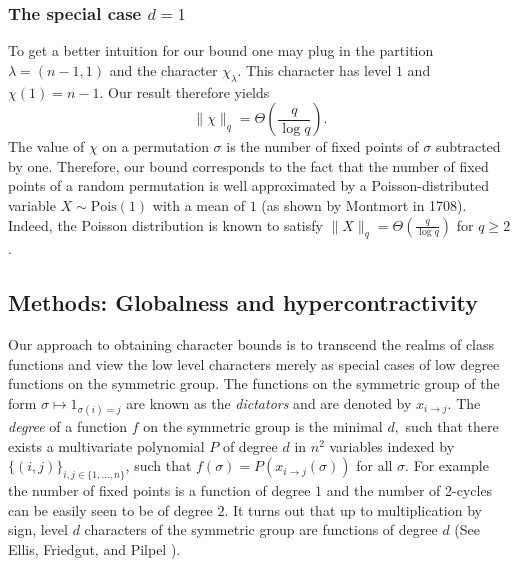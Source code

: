 \documentclass[11pt, letterpaper]{amsart}
\renewcommand\ge{\geqslant}
\begin{document}
\subsubsection*{The special case $d=1$}
To get a better intuition for our bound one may plug in the partition $\lambda = (n-1,1)$ and the character $\chi_{\lambda}.$ This character has level $1$ and $\chi(1)= n-1.$  Our result therefore yields 
\[ \|\chi\|_q = \Theta\left(\frac{q}{\log q} \right).
\]
The value of $\chi$ on a permutation $\sigma$ is the number of fixed points of $\sigma$ subtracted by one.
Therefore, our bound corresponds to the fact that the number of fixed points of a random permutation is well approximated by a Poisson-distributed variable $X\sim \text{Pois}(1)$ with a mean of $1$ (as shown by Montmort in 1708). Indeed, the Poisson distribution is known to satisfy $\|X\|_q=\Theta(\frac{q}{\log q})$ for $q \ge 2$.
 
\subsection{Methods: Globalness and hypercontractivity}
\label{subsec:globalness definitions}
Our approach to obtaining character bounds is to transcend the realms of class functions and view the low level characters merely as special cases of low degree functions on the symmetric group. 
The functions on the symmetric group of the form 
$\sigma \mapsto 1_{\sigma (i) =j}$
are known as the \emph{dictators} 
and are denoted by $x_{i\to j}$. The \emph{degree} of a function $f$ on the symmetric group is the minimal $d,$
such that there exists a multivariate polynomial $P$ of degree $d$ in $n^2$ variables indexed by $\{(i,j)\}_{i,j\in \{1,\dots,n\}}$, such that $f(\sigma) = P(x_{i\to j}(\sigma))$ for all $\sigma$. 
For example the number of fixed points is a function of degree $1$ and the number of 2-cycles can be easily seen to be of degree $2$. It turns out that up to multiplication by sign, level $d$ characters of the symmetric group are functions of degree $d$ (See Ellis, Friedgut, and Pilpel \cite[ Theorem 7]{ellis2011intersecting}).
\end{document}
